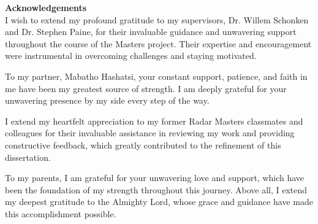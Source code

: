 \newpage
{}
\vspace*{3cm}
\noindent \large \textbf{\Huge Acknowledgements}
\\[1.5cm]
I wish to extend my profound gratitude to my supervisors, Dr. Willem Schonken and Dr. Stephen Paine, for their invaluable guidance and unwavering support throughout the course of the Masters project. Their expertise and encouragement were instrumental in overcoming challenges and staying motivated.

To my partner, Mabatho Hashatsi, your constant support, patience, and faith in me have been my greatest source of strength. I am deeply grateful for your unwavering presence by my side every step of the way.

I extend my heartfelt appreciation to my former Radar Masters classmates and colleagues for their invaluable assistance in reviewing my work and providing constructive feedback, which greatly contributed to the refinement of this dissertation.

To my parents, I am grateful for your unwavering love and support, which have been the foundation of my strength throughout this journey. Above all, I extend my deepest gratitude to the Almighty Lord, whose grace and guidance have made this accomplishment possible.